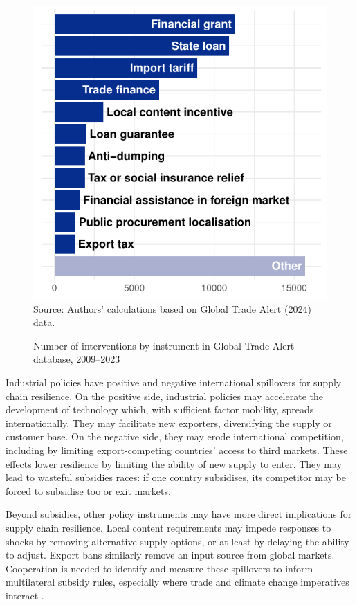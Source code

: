 \documentclass{article}
\begin{document}
\begin{figure}
    \caption{Number of interventions by instrument in Global Trade Alert database, 2009--2023}
    \label{fig:instruments}
    \centering
    \begin{minipage}{0.6\linewidth}
        \includegraphics[width = \linewidth]{instruments.pdf}
        \\
        \small{Source: Authors' calculations based on Global Trade Alert (2024) data.} 
    \end{minipage}
\end{figure}

Industrial policies have positive and negative international spillovers for supply chain resilience. On the positive side, industrial policies may accelerate the development of technology which, with sufficient factor mobility, spreads internationally. They may facilitate new exporters, diversifying the supply or customer base. On the negative side, they may erode international competition, including by limiting export-competing countries’ access to third markets. These effects lower resilience by limiting the ability of new supply to enter. They may lead to wasteful subsidies races: if one country subsidises, its competitor may be forced to subsidise too or exit markets.

Beyond subsidies, other policy instruments may have more direct implications for supply chain resilience. Local content requirements may impede responses to shocks by removing alternative supply options, or at least by delaying the ability to adjust. Export bans similarly remove an input source from global markets. Cooperation is needed to identify and measure these spillovers to inform multilateral subsidy rules, especially where trade and climate change imperatives interact \parencite{bown_modern_2024}.
\end{document}
